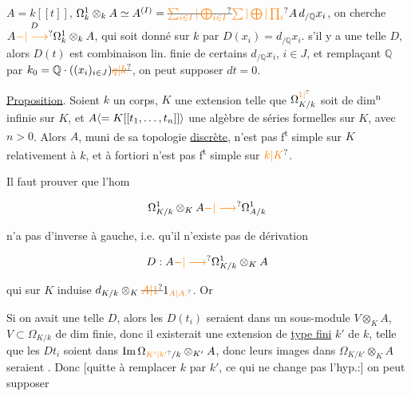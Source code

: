 $A=k[[t]]$, $\Omega^1_k\otimes_k A\simeq A^{(I)}=\deleted{\unsure{\sum_{i\in I}|\bigoplus_{i\in I}}}\unsure{\sum|\bigoplus|\prod_i} A\, d_{/\mathbb{Q}}x_i$, on cherche $A\overset{D}{\unsure{-|\longrightarrow}}\Omega^1_k\otimes_k A$, qui soit donné sur $k$ par $D(x_i)=d_{/\mathbb{Q}}x_i$.  s'il y a une telle $D$, alors $D(t)$ est combinaison lin. finie de certains $d_{/\mathbb{Q}}x_i$, $i\in J$, et remplaçant $\mathbb{Q}$ par $k_0=\mathbb{Q}\cdot((x_i)_{i\in J})\deleted{\unsure{q|k}}$, on peut supposer  $dt=0$. 

\uline{Proposition}. Soient $k$ un corps, $K$ une extension telle que $\Omega^{\unsure{1|\vphantom{1}}}_{K/k}$ soit de dim\textsuperscript{n} infinie sur $K$, et $A\inserted{=K[[t_1,\ldots,t_n]]}$ une algèbre de séries formelles sur $K$, avec $n>0$. Alors $A$, muni de sa topologie \uline{discrète}, n'est pas f\textsuperscript{t} simple sur $K$ relativement à $k$, et à fortiori n'est pas f\textsuperscript{t} simple sur $\unsure{k|K}$.

Il faut prouver que l'hom

\[ \Omega^1_{K/k}\otimes_K A\unsure{-|\longrightarrow}\Omega^1_{A/k} \]

n'a pas d'inverse à gauche, i.e. qu'il n'existe pas de dérivation

\[ D:A\unsure{-|\longrightarrow}\Omega^1_{K/k}\otimes_K A \]

qui sur $K$ induise $d_{K/k}\otimes_K\deleted{\unsure{A|1}}1_{\unsure{A|A.}}$. Or

Si on avait une telle $D$, alors les $D(t_i)$ seraient dans un sous-module $V\otimes_K A$, $V\subset\Omega_{K/k}$ de dim finie, donc il existerait une extension de \uline{type fini} $k'$ de $k$, telle que les $Dt_i$ soient dans $\operatorname{Im}\Omega_{\unsure{K'|k'}/k}\otimes_{K'}A$, donc leurs images dans $\Omega_{K/k'}\otimes_K A$ seraient . Donc [quitte à remplacer $k$ par $k'$, ce qui ne change pas l'hyp.:] on peut supposer


